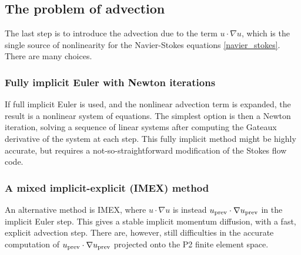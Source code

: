 \subsection{The problem of advection}
The last step is to introduce the advection due to the term $u\cdot \nabla u$,
which is the single source of nonlinearity for the Navier-Stokes equations \eqref{navier_stokes}.
There are many choices.

\subsubsection{Fully implicit Euler with Newton iterations}
If full implicit Euler is used, and the nonlinear advection term is expanded, the result is a nonlinear system of equations.
The simplest option is then a Newton iteration, solving a sequence of linear systems after computing the Gateaux derivative of the system
at each step. This fully implicit method might be highly accurate, but requires a not-so-straightforward modification of the Stokes flow code.

\subsubsection{A mixed implicit-explicit (IMEX) method}
An alternative method is IMEX, where $u\cdot \nabla u$ is instead ${u_{\text{prev}}} \cdot \nabla {u_{\text{prev}}}$ in the implicit Euler step.
This gives a stable implicit momentum diffusion, with a fast, explicit advection step. There are, however, still difficulties in the accurate computation
of ${u_{\text{prev}}} \cdot \nabla {u_{\text{prev}}}$ projected onto the P2 finite element space.

